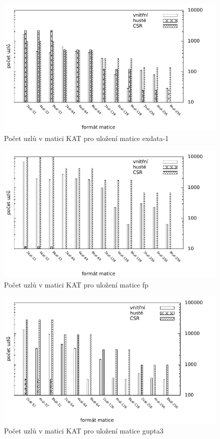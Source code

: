 \begin{figure}[htb]
	\includegraphics[width=1.0\textwidth]{./images/measure1/kat_nodes_exdata-1}
	\caption{Počet uzlů v matici KAT pro uložení matice exdata-1}
	\label{fig:mtxsizeexdata}
\end{figure}

\begin{figure}[htb]
	\includegraphics[width=1.0\textwidth]{./images/measure1/kat_nodes_fp}
	\caption{Počet uzlů v matici KAT pro uložení matice fp}
	\label{fig:mtxsizefp}
\end{figure}

\begin{figure}[htb]
	\includegraphics[width=1.0\textwidth]{./images/measure1/kat_nodes_gupta3}
	\caption{Počet uzlů v matici KAT pro uložení matice gupta3}
	\label{fig:mtxsizegupta}
\end{figure}

